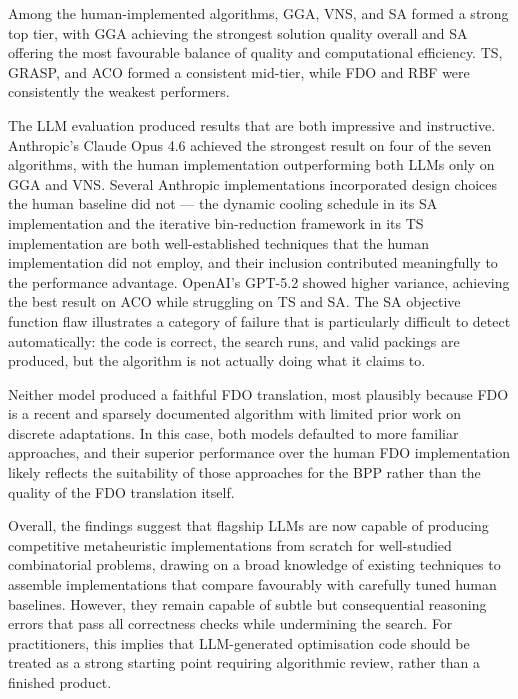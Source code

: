 \documentclass[11pt]{article}
\begin{document}
Among the human-implemented algorithms, GGA, VNS, and SA formed a strong top tier,
with GGA achieving the strongest solution quality overall and SA offering the most
favourable balance of quality and computational efficiency. TS, GRASP, and ACO formed
a consistent mid-tier, while FDO and RBF were consistently the weakest performers.

The LLM evaluation produced results that are both impressive and instructive.
Anthropic's Claude Opus 4.6 achieved the strongest result on four of the seven
algorithms, with the human implementation outperforming both LLMs only on GGA and VNS.
Several Anthropic implementations incorporated design choices the human baseline did
not --- the dynamic cooling schedule in its SA implementation and the iterative
bin-reduction framework in its TS implementation are both well-established techniques
that the human implementation did not employ, and their inclusion contributed
meaningfully to the performance advantage. OpenAI's GPT-5.2 showed higher variance,
achieving the best result on ACO while struggling on TS and SA. The SA objective
function flaw illustrates a category of failure that is particularly difficult to
detect automatically: the code is correct, the search runs, and valid packings are
produced, but the algorithm is not actually doing what it claims to.

Neither model produced a faithful FDO translation, most plausibly because FDO is a
recent and sparsely documented algorithm with limited prior work on discrete
adaptations. In this case, both models defaulted to more familiar approaches, and their
superior performance over the human FDO implementation likely reflects the suitability
of those approaches for the BPP rather than the quality of the FDO translation itself.

Overall, the findings suggest that flagship LLMs are now capable of producing
competitive metaheuristic implementations from scratch for well-studied combinatorial
problems, drawing on a broad knowledge of existing techniques to assemble
implementations that compare favourably with carefully tuned human baselines. However,
they remain capable of subtle but consequential reasoning errors that pass all
correctness checks while undermining the search. For practitioners, this implies that
LLM-generated optimisation code should be treated as a strong starting point requiring
algorithmic review, rather than a finished product.
\end{document}
